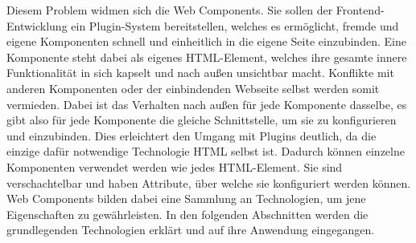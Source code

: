 Diesem Problem widmen sich die Web Components. Sie sollen der Frontend-Entwicklung ein Plugin-System bereitstellen, welches es ermöglicht, fremde und eigene Komponenten schnell und einheitlich in die eigene Seite einzubinden. Eine Komponente steht dabei als eigenes \ac{HTML}-Element, welches ihre gesamte innere Funktionalität in sich kapselt und nach außen unsichtbar macht. Konflikte mit anderen Komponenten oder der einbindenden Webseite selbst werden somit vermieden. Dabei ist das Verhalten nach außen für jede Komponente dasselbe, es gibt also für jede Komponente die gleiche Schnittstelle, um sie zu konfigurieren und einzubinden. Dies erleichtert den Umgang mit Plugins deutlich, da die einzige dafür notwendige Technologie \ac{HTML} selbst ist. Dadurch können einzelne Komponenten verwendet werden wie jedes \ac{HTML}-Element. Sie sind verschachtelbar und haben Attribute, über welche sie konfiguriert werden können. Web Components bilden dabei eine Sammlung an Technologien, um jene Eigenschaften zu gewährleisten. In den folgenden Abschnitten werden die grundlegenden Technologien erklärt und auf ihre Anwendung eingegangen.
